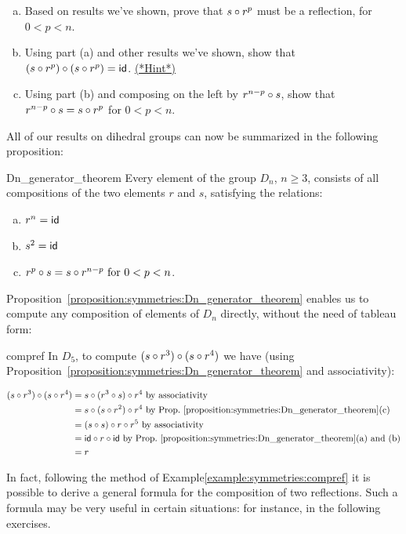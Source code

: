 \begin{exercise}{41}
\begin{enumerate}[(a)]
\item
Based on results we've shown, prove that $s \circ r^p$ must be a reflection, for $0 < p < n$.
\item
Using part (a) and other results we've shown, show that $(s \circ r^p) \circ (s \circ r^p) = {\sf{i}d}$.
\hyperref[sec:symmetries:hints]{(*Hint*)}
\item
Using part (b) and composing on the left by $r^{n-p} \circ s$, show that $  r^{n-p} \circ s = s \circ r^p$  for $0< p < n$.
\end{enumerate}
\end{exercise}

All of our results on dihedral groups can now be summarized in the following proposition:

\begin{prop}{Dn_generator_theorem}
Every element of the group $D_n$, $n \geq 3$, consists of all compositions of the two 
elements $r$ and $s$, satisfying the relations:
\begin{enumerate}[(a)]
\item
$r^n  = {\sf{i}d}$
\item
$s^2  = {\sf{i}d} $
\item
$ r^p \circ s  = s \circ  r^{n-p} \mbox{ for } 0<p<n$.
\end{enumerate}
\end{prop}
 
Proposition~\ref{proposition:symmetries:Dn_generator_theorem} enables us to compute any composition of elements of $D_n$ directly, without 
the need of tableau form:

\begin{example}{compref}
In $D_5$, to compute $(s \circ r^3) \circ (s \circ r^4)$ we have (using Proposition~\ref{proposition:symmetries:Dn_generator_theorem} and associativity):  

\begin{align*}
(s \compose r^3) \compose (s \compose r^4) &= s \compose (r^3 \compose s) \compose r^4 \mbox{     by associativity}\\
&= s \compose (s \compose r^2) \compose r^4 \mbox{      by Prop.~\ref{proposition:symmetries:Dn_generator_theorem}(c)}\\
&= (s \compose s) \compose r \compose r^5 \mbox{      by  associativity}\\
&= {\var id} \compose r \compose {\var id} \mbox{      by Prop.~\ref{proposition:symmetries:Dn_generator_theorem}(a) and (b)}\\
&= r
\end{align*}
\end{example}
In fact, following the method of Example\ref{example:symmetries:compref} it is possible to derive a general formula for the composition of two reflections. Such a formula may be very useful in certain situations: for instance, in the following exercises.

